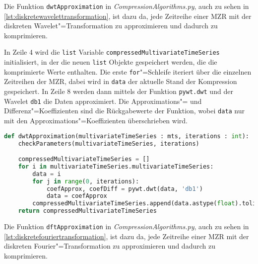 Die Funktion \lstinline|dwtApproximation| in \textit{CompressionAlgorithms.py}, auch zu sehen in \autoref{lst:diskretewavelettransformation}, ist dazu da, jede Zeitreihe einer \ac{MZR} mit der diskreten Wavelet"=Transformation zu approximieren und dadurch zu komprimieren.

In Zeile 4 wird die \lstinline|list| Variable \lstinline|compressedMultivariateTimeSeries| initialisiert, in der die neuen \lstinline|list| Objekte gespeichert werden, die die komprimierte Werte enthalten. Die erste \lstinline|for|"=Schleife iteriert über die einzelnen Zeitreihen der \ac{MZR}, dabei wird in \lstinline|data| der aktuelle Stand der Kompression gespeichert. In Zeile 8 werden dann mittels der Funktion \lstinline|pywt.dwt| und der Wavelet \lstinline|db1| die Daten approximiert. Die Approximations"= und Differenz"=Koeffizienten sind die Rückgabewerte der Funktion, wobei \lstinline|data| nur mit den Approximations"=Koeffizienten überschrieben wird.
\begin{lstlisting}[caption=Stückweise polynomielle Approximation, label=lst:diskretewavelettransformation, style=Python, language=Python]
def dwtApproximation(multivariateTimeSeries : mts, iterations : int):
    checkParameters(multivariateTimeSeries, iterations)

    compressedMultivariateTimeSeries = []
    for i in multivariateTimeSeries.multivariateTimeSeries:
        data = i
        for j in range(0, iterations):
            coefApprox, coefDiff = pywt.dwt(data, 'db1')
            data = coefApprox
        compressedMultivariateTimeSeries.append(data.astype(float).tolist())
    return compressedMultivariateTimeSeries
\end{lstlisting}

Die Funktion \lstinline|dftApproximation| in \textit{CompressionAlgorithms.py}, auch zu sehen in \autoref{lst:diskretefouriertransformation}, ist dazu da, jede Zeitreihe einer \ac{MZR} mit der diskreten Fourier"=Transformation zu approximieren und dadurch zu komprimieren.

